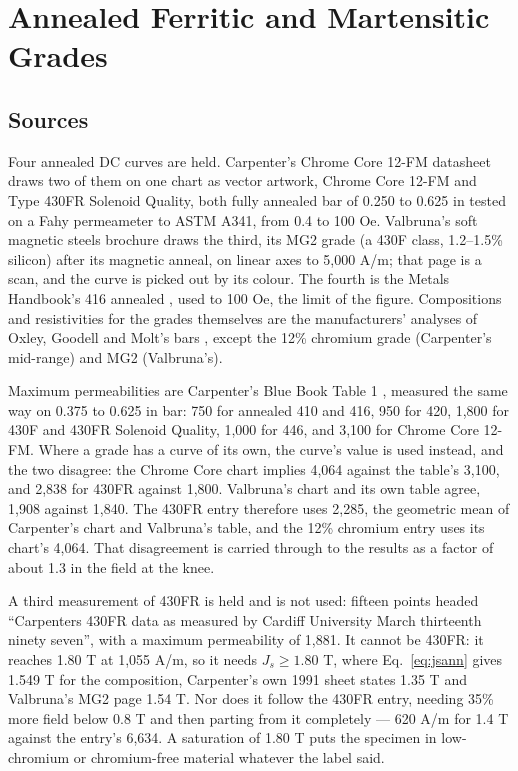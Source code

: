 \documentclass[
  11pt,
]{article}
\begin{document}
\section{Annealed Ferritic and Martensitic Grades}\label{annealed}

\subsection{Sources}\label{annealed-sources}

Four annealed DC curves are held. Carpenter's Chrome Core 12-FM datasheet \cite{carpenter-cc12fm} draws two of them on one chart as vector artwork, Chrome Core 12-FM and Type 430FR Solenoid Quality, both fully annealed bar of 0.250 to 0.625 in tested on a Fahy permeameter to ASTM A341, from 0.4 to 100 Oe. Valbruna's soft magnetic steels brochure \cite{valbruna} draws the third, its MG2 grade (a 430F class, 1.2--1.5\% silicon) after its magnetic anneal, on linear axes to 5,000 A/m; that page is a scan, and the curve is picked out by its colour. The fourth is the Metals Handbook's 416 annealed \cite{mh8}, used to 100 Oe, the limit of the figure. Compositions and resistivities for the grades themselves are the manufacturers' analyses of Oxley, Goodell and Molt's bars \cite{oxley}, except the 12\% chromium grade (Carpenter's mid-range) and MG2 (Valbruna's).

Maximum permeabilities are Carpenter's Blue Book Table 1 \cite{bluebook}, measured the same way on 0.375 to 0.625 in bar: 750 for annealed 410 and 416, 950 for 420, 1,800 for 430F and 430FR Solenoid Quality, 1,000 for 446, and 3,100 for Chrome Core 12-FM. Where a grade has a curve of its own, the curve's value is used instead, and the two disagree: the Chrome Core chart implies 4,064 against the table's 3,100, and 2,838 for 430FR against 1,800. Valbruna's chart and its own table agree, 1,908 against 1,840. The 430FR entry therefore uses 2,285, the geometric mean of Carpenter's chart and Valbruna's table, and the 12\% chromium entry uses its chart's 4,064. That disagreement is carried through to the results as a factor of about 1.3 in the field at the knee.

A third measurement of 430FR is held and is not used: fifteen points headed ``Carpenters 430FR data as measured by Cardiff University March thirteenth ninety seven'', with a maximum permeability of 1,881. It cannot be 430FR: it reaches 1.80 T at 1,055 A/m, so it needs \(J_s \ge 1.80\) T, where Eq.~\eqref{eq:jsann} gives 1.549 T for the composition, Carpenter's own 1991 sheet states 1.35 T and Valbruna's MG2 page 1.54 T. Nor does it follow the 430FR entry, needing 35\% more field below 0.8 T and then parting from it completely --- 620 A/m for 1.4 T against the entry's 6,634. A saturation of 1.80 T puts the specimen in low-chromium or chromium-free material whatever the label said.
\end{document}
